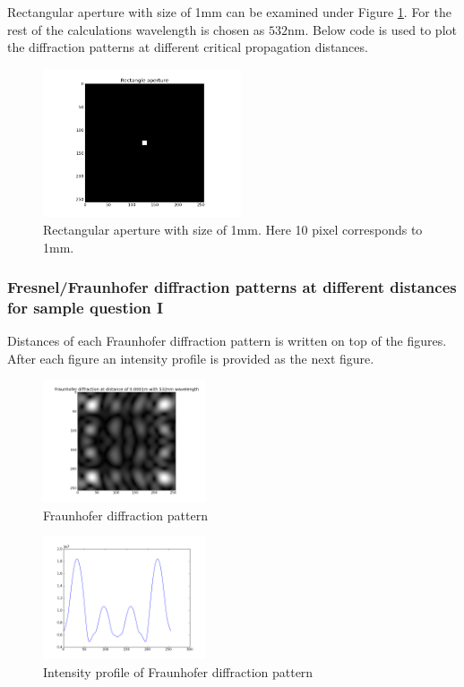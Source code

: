 \documentclass[journal,9pt]{IEEEtran}
\begin{document}
Rectangular aperture with size of 1mm can be examined under Figure \ref{fig:rectangle1m}. For the rest of the calculations wavelength is chosen as $532$nm. Below code is used to plot the diffraction patterns at different critical propagation distances.

\lstset{language=Python,breaklines=true}


\begin{figure}[H]
\centering
\includegraphics[width=2.3in]{rectangle1mm}
\caption{Rectangular aperture with size of 1mm. Here 10 pixel corresponds to 1mm.}
\label{fig:rectangle1m}
\end{figure}

\subsubsection{Fresnel/Fraunhofer diffraction patterns at different distances for sample question I}

Distances of each Fraunhofer diffraction pattern is written on top of the figures. After each figure an intensity profile is provided as the next figure.
\begin{figure}[H]
\centering
\includegraphics[width=1.9in]{q1d100um}
\caption{Fraunhofer diffraction pattern}
\label{fig:q1d100um}
\end{figure}

\begin{figure}[H]
\centering
\includegraphics[width=1.9in]{q1i100um}
\caption{Intensity profile of Fraunhofer diffraction pattern}
\label{fig:q1i100um}
\end{figure}
\end{document}
